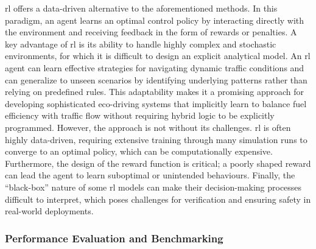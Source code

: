 \mynewline
\ac{rl} offers a data-driven alternative to the aforementioned methods. In this paradigm, an agent learns an optimal control policy by interacting directly with the environment and receiving feedback in the form of rewards or penalties. A key advantage of \ac{rl} is its ability to handle highly complex and stochastic environments, for which it is difficult to design an explicit analytical model. An \ac{rl} agent can learn effective strategies for navigating dynamic traffic conditions and can generalize to unseen scenarios by identifying underlying patterns rather than relying on predefined rules. This adaptability makes it a promising approach for developing sophisticated eco-driving systems that implicitly learn to balance fuel efficiency with traffic flow without requiring hybrid logic to be explicitly programmed. However, the approach is not without its challenges. \ac{rl} is often highly data-driven, requiring extensive training through many simulation runs to converge to an optimal policy, which can be computationally expensive. Furthermore, the design of the reward function is critical; a poorly shaped reward can lead the agent to learn suboptimal or unintended behaviours. Finally, the \enquote{black-box} nature of some \ac{rl} models can make their decision-making processes difficult to interpret, which poses challenges for verification and ensuring safety in real-world deployments.


\subsubsection{Performance Evaluation and Benchmarking}
\label{subsubsec:performance_evaluation}

